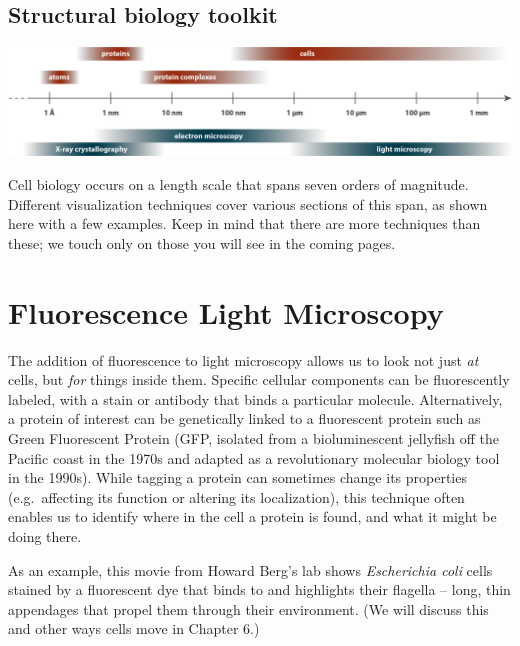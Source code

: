 \documentclass[]{tufte-book}
\begin{document}
\subsection{Structural biology
toolkit}\label{Structural_biology_toolkit}

\includegraphics{img/schematics/1_1_1}

Cell biology occurs on a length scale that spans seven orders of
magnitude. Different visualization techniques cover various sections of
this span, as shown here with a few examples. Keep in mind that there
are more techniques than these; we touch only on those you will see in
the coming pages.

\section{Fluorescence Light
Microscopy}\label{fluorescence-light-microscopy}

The addition of fluorescence to light microscopy allows us to look not
just \emph{at} cells, but \emph{for} things inside them. Specific
cellular components can be fluorescently labeled, with a stain or
antibody that binds a particular molecule. Alternatively, a protein of
interest can be genetically linked to a fluorescent protein such as
Green Fluorescent Protein (GFP, isolated from a bioluminescent jellyfish
off the Pacific coast in the 1970s and adapted as a revolutionary
molecular biology tool in the 1990s). While tagging a protein can
sometimes change its properties (e.g.~affecting its function or altering
its localization), this technique often enables us to identify where in
the cell a protein is found, and what it might be doing there.

As an example, this movie from Howard Berg's lab \citep{berg}
\citep{turner2000} shows \emph{Escherichia coli} cells stained by a
fluorescent dye that binds to and highlights their flagella -- long,
thin appendages that propel them through their environment. (We will
discuss this and other ways cells move in Chapter 6.)
\end{document}

